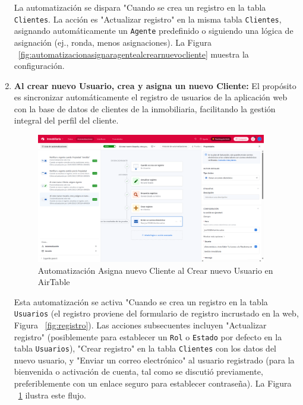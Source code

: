 \begin{enumerate}
    La automatización se dispara "Cuando se crea un registro en la tabla \texttt{Clientes}. La acción es "Actualizar registro" en la misma tabla \texttt{Clientes}, asignando automáticamente un \texttt{Agente} predefinido o siguiendo una lógica de asignación (ej., ronda, menos asignaciones). La Figura ~\ref{fig:automatizacionasignaragentealcrearnuevocliente} muestra la configuración.

    \item \textbf{Al crear nuevo Usuario, crea y asigna un nuevo Cliente:} El propósito es sincronizar automáticamente el registro de usuarios de la aplicación web con la base de datos de clientes de la inmobiliaria, facilitando la gestión integral del perfil del cliente.

    \begin{figure}[H]
        \begin{center}
            \includegraphics[width = 0.95\textwidth]{Figuras/automatizacionasignanuevoclientealcrearnuevousuario.png}
        \end{center}
        \caption{\label{fig:automatizacionasignanuevoclientealcrearnuevousuario} Automatización Asigna nuevo Cliente al Crear nuevo Usuario en AirTable}
    \end{figure}

    Esta automatización se activa "Cuando se crea un registro en la tabla \texttt{Usuarios} (el registro proviene del formulario de registro incrustado en la web, Figura ~\ref{fig:registro}). Las acciones subsecuentes incluyen "Actualizar registro" (posiblemente para establecer un \texttt{Rol} o \texttt{Estado} por defecto en la tabla \texttt{Usuarios}), "Crear registro" en la tabla \texttt{Clientes} con los datos del nuevo usuario, y "Enviar un correo electrónico" al usuario registrado (para la bienvenida o activación de cuenta, tal como se discutió previamente, preferiblemente con un enlace seguro para establecer contraseña). La Figura ~\ref{fig:automatizacionasignanuevoclientealcrearnuevousuario} ilustra este flujo.


\end{enumerate}
